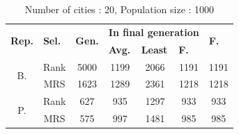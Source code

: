 \documentclass[10pt,a4paper,openbib]{article}
\begin{document}
\begin{multicols}{2}
\begin{table}[H]
\centering
\begin{tabular}{|c|c|c|c|c|c|c|}
\hline
\multicolumn{1}{|l|}{\multirow{2}{*}{\textbf{Rep.}}} & \multicolumn{1}{l|}{\multirow{2}{*}{\textbf{Sel.}}} & \multicolumn{1}{l|}{\multirow{2}{*}{\textbf{Gen.}}} & \multicolumn{3}{c|}{\textbf{In final generation}}                                                                & \multicolumn{1}{l|}{\multirow{2}{*}{\textbf{F.}}} \\ \cline{4-6}
\multicolumn{1}{|l|}{}                               & \multicolumn{1}{l|}{}                               & \multicolumn{1}{l|}{}                               & \multicolumn{1}{l|}{\textbf{Avg.}} & \multicolumn{1}{l|}{\textbf{Least}} & \multicolumn{1}{l|}{\textbf{F.}} & \multicolumn{1}{l|}{}                                  \\ \hline
\multirow{2}{*}{B.}                                  & Rank                                                & 5000                                                & 1199                               & 2066                                & 1191                                  & 1191                                                   \\ \cline{2-7} 
                                                     & MRS                                                & 1623                                                & 1289                               & 2361                                & 1218                                  & 1218                                                   \\ \hline
\multirow{2}{*}{P.}                                  & Rank                                                & 627                                                 & 935                               & 1297                                & 933                                  & 933                                                   \\ \cline{2-7} 
                                                     & MRS                                                & 575                                                 & 997                                & 1481                                & 985                                   & 985                                                    \\ \hline
\end{tabular}
\caption{Number of cities : 20, Population size : 1000}
\label{table:20cities}
\end{table}


\end{multicols}
\end{document}
